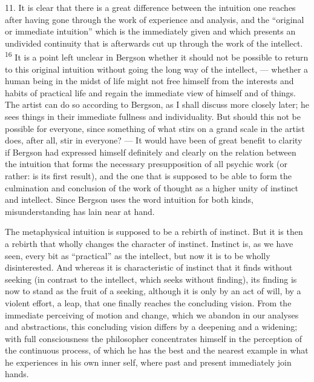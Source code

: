 \documentclass[12pt,a4paper,openany]{book}
\newcommand{\opage}[1]{\marginnote{\footnotesize\textit{[#1]}}}
\newcommand{\nm}[1]{\unskip\textsuperscript{#1}}
\begin{document}
11. It is clear that there is a great difference between the intuition one reaches after having gone through the work of experience and analysis, and the ``original or immediate intuition'' which is the immediately given and which presents an undivided continuity that is afterwards cut up through the work of the intellect. \nm{16} It is a point left unclear in Bergson whether it should not be possible to return to this original intuition without going the long way of the intellect, --- whether a human being in the midst of life might not free himself from the interests and habits of practical life and regain the immediate view of himself and of things. The artist can do so according to Bergson, as I shall discuss more closely later; he sees things in their immediate fullness and individuality. But should this not be possible for everyone, since something of what stirs on a grand scale in the artist does, after all, stir in everyone? --- It would have been of great benefit to clarity if Bergson had expressed himself definitely and clearly on the relation between the intuition that forms the necessary presupposition of all psychic work (or rather: is its first result), and the one that is supposed to be able to form the culmination and conclusion of the work of thought as a higher unity of instinct and intellect. Since Bergson uses the word intuition for both kinds, misunderstanding has lain near at hand.

The metaphysical intuition is supposed to be a rebirth of instinct. But it is then a rebirth that wholly changes the character of instinct. Instinct is, as we have seen, every bit as ``practical'' as the intellect, but now it is to be wholly disinterested. And whereas it is characteristic of instinct that it finds without seeking (in contrast to the intellect, which seeks without finding), its finding is now to stand as the fruit of a seeking, although it is only by an act of will, by a violent effort, a leap, that one finally reaches the concluding vision.
\opage{22}From the immediate perceiving of motion and change, which we abandon in our analyses and abstractions, this concluding vision differs by a deepening and a widening; with full consciousness the philosopher concentrates himself in the perception of the continuous process, of which he has the best and the nearest example in what he experiences in his own inner self, where past and present immediately join hands.
\end{document}
